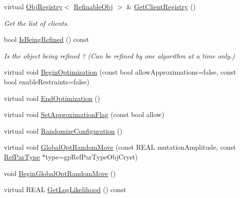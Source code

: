 \begin{DoxyCompactItemize}
\mbox{\label{class_obj_cryst_1_1_refinable_obj_a85806a2764705f9ec5fa9d436d0c0ee9}} 
virtual \mbox{\hyperlink{class_obj_cryst_1_1_obj_registry}{Obj\+Registry}}$<$ \mbox{\hyperlink{class_obj_cryst_1_1_refinable_obj}{Refinable\+Obj}} $>$ \& \mbox{\hyperlink{class_obj_cryst_1_1_refinable_obj_a85806a2764705f9ec5fa9d436d0c0ee9}{Get\+Client\+Registry}} ()
\begin{DoxyCompactList}\small\item\em Get the list of clients. \end{DoxyCompactList}\item 
\mbox{\label{class_obj_cryst_1_1_refinable_obj_a16b62c6e24f10fcff436136907f0dcc0}} 
bool \mbox{\hyperlink{class_obj_cryst_1_1_refinable_obj_a16b62c6e24f10fcff436136907f0dcc0}{Is\+Being\+Refined}} () const
\begin{DoxyCompactList}\small\item\em Is the object being refined ? (Can be refined by one algorithm at a time only.) \end{DoxyCompactList}\item 
virtual void \mbox{\hyperlink{class_obj_cryst_1_1_refinable_obj_a55da6256532023f40769c79eef074703}{Begin\+Optimization}} (const bool allow\+Approximations=false, const bool enable\+Restraints=false)
\item 
virtual void \mbox{\hyperlink{class_obj_cryst_1_1_refinable_obj_a05342aa16f7b0c0a2cf3380de16f75ef}{End\+Optimization}} ()
\item 
virtual void \mbox{\hyperlink{class_obj_cryst_1_1_refinable_obj_a4cec55794b964b148ef44bf244ad4104}{Set\+Approximation\+Flag}} (const bool allow)
\item 
virtual void \mbox{\hyperlink{class_obj_cryst_1_1_refinable_obj_ae0d568b66a8bfe39ebbb648d68a57239}{Randomize\+Configuration}} ()
\item 
virtual void \mbox{\hyperlink{class_obj_cryst_1_1_refinable_obj_afcbc5dbf18eca074efa669ba9f51502f}{Global\+Opt\+Random\+Move}} (const R\+E\+AL mutation\+Amplitude, const \mbox{\hyperlink{class_obj_cryst_1_1_ref_par_type}{Ref\+Par\+Type}} $\ast$type=gp\+Ref\+Par\+Type\+Obj\+Cryst)
\item 
void \mbox{\hyperlink{class_obj_cryst_1_1_refinable_obj_a47fc5a85493671a3590ed7e3971b18fe}{Begin\+Global\+Opt\+Random\+Move}} ()
\item 
virtual R\+E\+AL \mbox{\hyperlink{class_obj_cryst_1_1_refinable_obj_acd925d3b1ee87266481a719b40e11791}{Get\+Log\+Likelihood}} () const

\end{DoxyCompactItemize}
